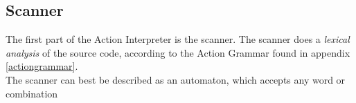 \subsection{Scanner}
The first part of the Action Interpreter is the scanner. The scanner does a \textit{lexical analysis} of the source code, according to the Action Grammar found in appendix \ref{actiongrammar}.\\
The scanner can best be described as an automaton, which accepts any word or combination